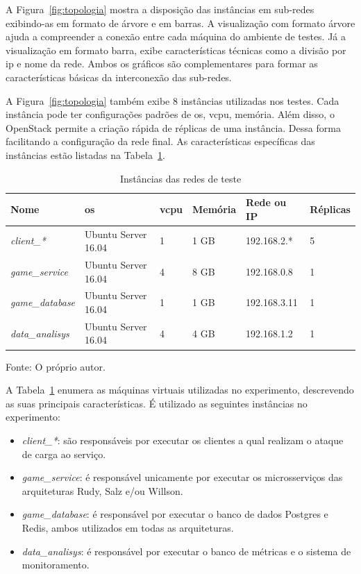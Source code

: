 A Figura~\ref{fig:topologia} mostra a disposição das instâncias em sub-redes exibindo-as em formato de árvore e em barras.
%
A visualização com formato árvore ajuda a compreender a conexão entre cada máquina do ambiente de testes.
%
Já a visualização em formato barra, exibe características técnicas como a divisão por \ac{ip} e nome da rede.
%
Ambos os gráficos são complementares para formar as características básicas da interconexão das sub-redes.

A Figura~\ref{fig:topologia} também exibe 8 instâncias utilizadas nos testes.
%
Cada instância pode ter configurações padrões de \ac{os}, \acs{vcpu}, memória.
%
Além disso, o OpenStack permite a criação rápida de réplicas de uma instância.
%
Dessa forma facilitando a configuração da rede final.
%
As características específicas das instâncias estão listadas na Tabela~\ref{tab:instancias}.

\begin{table}[htb!]
    \centering
    \caption{Instâncias das redes de teste}
    \label{tab:instancias}
    \begin{tabular}{|l|l|l|l|l|l|}
        \hline
        Nome                    & \ac{os}             &\acs{vcpu}& Memória & Rede ou IP   & Réplicas \\ \hline
        \textit{client\_*}      & Ubuntu Server 16.04 & 1        & 1 GB    & 192.168.2.*  & 5        \\ \hline
        \textit{game\_service}  & Ubuntu Server 16.04 & 4        & 8 GB    & 192.168.0.8  & 1        \\ \hline
        \textit{game\_database} & Ubuntu Server 16.04 & 1        & 1 GB    & 192.168.3.11 & 1        \\ \hline
        \textit{data\_analisys} & Ubuntu Server 16.04 & 4        & 4 GB    & 192.168.1.2  & 1        \\ \hline
    \end{tabular}

    Fonte: O próprio autor.
\end{table}

A Tabela~\ref{tab:instancias} enumera as máquinas virtuais utilizadas no experimento, descrevendo as suas principais características.
%
É utilizado as seguintes instâncias no experimento:

\begin{itemize}
    \item \textit{client\_*}: são responsáveis por executar os clientes a qual realizam o ataque de carga ao serviço.
    \item \textit{game\_service}: é responsável unicamente por executar os microsserviços das arquiteturas Rudy, Salz e/ou Willson.
    \item \textit{game\_database}: é responsável por executar o banco de dados Postgres e Redis, ambos utilizados em todas as arquiteturas.
    \item \textit{data\_analisys}: é responsável por executar o banco de métricas e o sistema de monitoramento.
\end{itemize}

